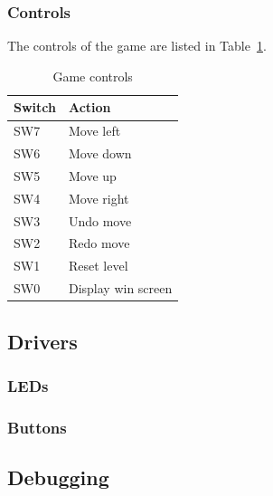 \documentclass[a4paper,11pt]{article}
\begin{document}
\subsubsection{Controls}
The controls of the game are listed in Table~\ref{tab:gamecontrols}. 
\begin{table}[H]
\centering
\begin{tabular}{|l|l|}
\hline \textbf{Switch} & \textbf{Action} \\ 
\hline SW7 & Move left \\ 
\hline SW6 & Move down \\ 
\hline SW5 & Move up \\ 
\hline SW4 & Move right \\ 
\hline SW3 & Undo move \\ 
\hline SW2 & Redo move \\ 
\hline SW1 & Reset level \\ 
\hline SW0 & Display win screen \\ 
\hline 
\end{tabular}
\caption{Game controls} 
\label{tab:gamecontrols}
\end{table}

\subsection{Drivers}
\subsubsection{LEDs}

\subsubsection{Buttons}



\subsection*{Debugging}



\end{document}
